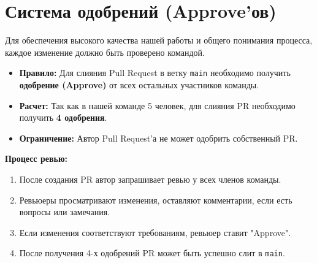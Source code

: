 \documentclass[12pt,a4paper]{article}
\begin{document}
\section{Система одобрений (Approve'ов)}

Для обеспечения высокого качества нашей работы и общего понимания процесса, каждое изменение должно быть проверено командой.

\begin{itemize}
    \item \textbf{Правило:} Для слияния Pull Request в ветку \texttt{main} необходимо получить \textbf{одобрение (Approve)} от всех остальных участников команды.
    \item \textbf{Расчет:} Так как в нашей команде 5 человек, для слияния PR необходимо получить \textbf{4 одобрения}.
    \item \textbf{Ограничение:} Автор Pull Request'а не может одобрить собственный PR.
\end{itemize}

\textbf{Процесс ревью:}
\begin{enumerate}
    \item После создания PR автор запрашивает ревью у всех членов команды.
    \item Ревьюеры просматривают изменения, оставляют комментарии, если есть вопросы или замечания.
    \item Если изменения соответствуют требованиям, ревьюер ставит "Approve".
    \item После получения 4-х одобрений PR может быть успешно слит в \texttt{main}.
\end{enumerate}
\end{document}
